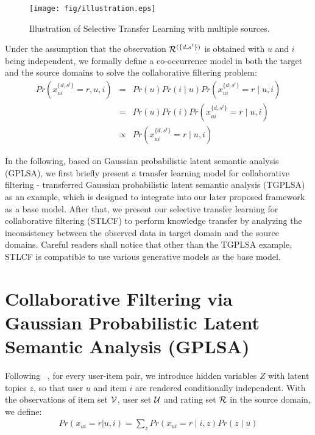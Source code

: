 \begin{figure}
\centering
\texttt{[image: fig/illustration.eps]}
\caption{Illustration of Selective Transfer Learning with multiple sources.}
\label{fig:illustration}
\end{figure}

Under the assumption that the observation $\mathcal{R}^{(\{d, s^t\})}$ is obtained with $u$ and $i$ being independent, we formally define a co-occurrence model in both the target and the source domains to solve the collaborative filtering problem:
\begin{eqnarray}
\nonumber
Pr(x^{\{d, s^t\}}_{ui}=r,u,i) \!\!\!\!\!\!&=&\!\!\!\!\!\! Pr(u) Pr(i \mid u) Pr(x^{\{d, s^t\}}_{ui}=r \mid u,i) \\
\nonumber
\!\!\!\!\!\!&=&\!\!\!\!\!\! Pr(u) Pr(i) Pr(x^{\{d, s^t\}}_{ui}=r \mid u,i) \\
\nonumber
\!\!\!\!\!\!&\propto&\!\!\!\!\!\! Pr(x^{\{d, s^t\}}_{ui}=r \mid u,i)
\end{eqnarray}

In the following, based on Gaussian probabilistic latent semantic analysis (GPLSA), we first briefly present a transfer learning model for collaborative filtering - transferred Gaussian probabilistic latent semantic analysis (TGPLSA) as an example, which is designed to integrate into our later proposed framework as a base model. After that, we present our selective transfer learning for collaborative filtering (STLCF) to perform knowledge transfer by analyzing the inconsistency between the observed data in target domain and the source domains. Careful readers shall notice that other than the TGPLSA example, STLCF is compatible to use various generative models as the base model.

\hspace{0.1in}
\section{Collaborative Filtering via Gaussian Probabilistic Latent Semantic Analysis (GPLSA)}
Following ~\cite{DBLP:conf/sigir/Hofmann03}, for every user-item pair, we introduce hidden variables $Z$ with latent topics $z$, so that user $u$ and item $i$ are rendered conditionally independent. With the observations of item set $\mathcal{V}$, user set $\mathcal{U}$ and rating set $\mathcal{R}$ in the source domain, we define:
\begin{eqnarray}
\nonumber
Pr(x_{ui} = r | u, i) = \sum_{z} Pr(x_{ui} = r \mid i, z) Pr(z \mid u)
\end{eqnarray}
\vspace{-5mm}

